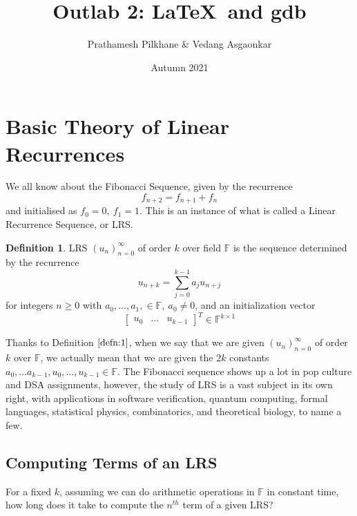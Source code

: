 \documentclass{article}
\title{Outlab 2: \LaTeX~and gdb}
\author{Prathamesh Pilkhane \& Vedang Asgaonkar}
\date{Autumn 2021}
\newcommand{\leavespace}{\medskip \newline}
\begin{document}
\maketitle
\tableofcontents
\pagestyle{fancy}
\fancyhf{}
\renewcommand{\footrulewidth }{1 pt }
\pagebreak


\section{Basic Theory of Linear Recurrences}
We all know about the Fibonacci Sequence, given by the recurrence
\begin{equation*}
    f_{n+2} = f_{n+1} + f_{n}
\end{equation*}
and initialised as $f_0 = 0,~ f_1 = 1$. This is an instance of what is called a Linear Recurrence Sequence, or LRS.
\theoremstyle{definition}
\newtheorem{defn}{Definition}[section]
\begin{defn}
\label{defn:1}
    LRS $(u_n)_{n=0}^\infty$ of order $k$ over field $\mathbb{F}$ is the sequence determined by the recurrence
    \begin{equation}
        u_{n+k} = \sum_{j=0}^{k-1} a_j u_{n+j}
    \end{equation}
    for integers $n \ge 0$ with $a_0,\dots,a_1, \in \mathbb{F}, ~a_0 \neq 0$, and an initialization vector
    \begin{equation*}
    \begin{bmatrix}
    u_0 & \dots & u_{k-1}
    \end{bmatrix}^T \in \mathbb{F}^{k \times 1}
    \end{equation*}
\end{defn}


Thanks to Definition $\ref{defn:1}$, when we say that we are given $(u_n)_{n=0}^\infty$ of order $k$ over $\mathbb{F}$, we actually mean that we are given the $2k$ constants $a_0 , \dots a_{k−1} , u_0 ,\dots , u_{k−1} \in \mathbb{F}$.
\leavespace
The Fibonacci sequence shows up a lot in pop culture and DSA assignments, however, the study
of LRS is a vast subject in its own right, with applications in software verification, quantum
computing, formal languages, statistical physics, combinatorics, and theoretical biology, to name
a few.

\subsection{Computing Terms of an LRS}
For a fixed $k$, assuming we can do arithmetic operations in $\mathbb{F}$ in constant time, how long does it take to compute the $n^{th}$ term of a given LRS?
\end{document}
